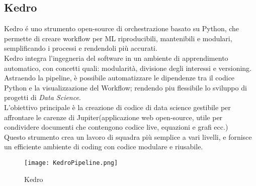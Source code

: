 \documentclass[../tesi.tex]{subfiles}
\begin{document}
\subsection{Kedro}
  Kedro é uno strumento open-source di orchestrazione basato su Python, che permette di creare workflow per ML riproducibili, mantenibili e modulari, semplificando i processi e rendendoli più accurati.\\
  Kedro integra l’ingegneria del software in un ambiente di apprendimento automatico, con concetti quali: modularità, divisione degli interessi e versioning.\\
  Astraendo la pipeline, è possibile automatizzare le dipendenze tra il codice Python e la visualizzazione del Workflow; rendendo piu flessibile lo sviluppo di progetti di \textit{Data Science}.\\
  L’obiettivo principale è la creazione di codice di data science gestibile per affrontare le carenze di Jupiter(applicazione web open-source, utile per condividere documenti che contengono codice live, equazioni e grafi ecc.)\\
  Questo strumento crea un lavoro di squadra più semplice a vari livelli, e fornisce un efficiente ambiente di coding con codice modulare e riusabile.
\begin{figure}[htbp]
  \centering
  \texttt{[image: KedroPipeline.png]} 
  \caption{Kedro}
  \end{figure}  
\end{document}
